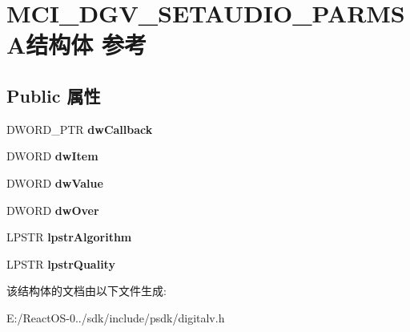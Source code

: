 \hypertarget{struct_m_c_i___d_g_v___s_e_t_a_u_d_i_o___p_a_r_m_s_a}{}\section{M\+C\+I\+\_\+\+D\+G\+V\+\_\+\+S\+E\+T\+A\+U\+D\+I\+O\+\_\+\+P\+A\+R\+M\+S\+A结构体 参考}
\label{struct_m_c_i___d_g_v___s_e_t_a_u_d_i_o___p_a_r_m_s_a}
\subsection*{Public 属性}
\begin{DoxyCompactItemize}
\item 
\mbox{\label{struct_m_c_i___d_g_v___s_e_t_a_u_d_i_o___p_a_r_m_s_a_ae3b97b8e94c676bb8e2e555ccc8f440f}} 
D\+W\+O\+R\+D\+\_\+\+P\+TR {\bfseries dw\+Callback}
\item 
\mbox{\label{struct_m_c_i___d_g_v___s_e_t_a_u_d_i_o___p_a_r_m_s_a_a71dc7ccebb1aee7948189930ead66404}} 
D\+W\+O\+RD {\bfseries dw\+Item}
\item 
\mbox{\label{struct_m_c_i___d_g_v___s_e_t_a_u_d_i_o___p_a_r_m_s_a_a4cf0da609994ae6bc2f5ab71af22732f}} 
D\+W\+O\+RD {\bfseries dw\+Value}
\item 
\mbox{\label{struct_m_c_i___d_g_v___s_e_t_a_u_d_i_o___p_a_r_m_s_a_aaa91a9e61b44b130e3cf245405308dcb}} 
D\+W\+O\+RD {\bfseries dw\+Over}
\item 
\mbox{\label{struct_m_c_i___d_g_v___s_e_t_a_u_d_i_o___p_a_r_m_s_a_a59c4c07f2d9e7a5c7153371bb3348d3f}} 
L\+P\+S\+TR {\bfseries lpstr\+Algorithm}
\item 
\mbox{\label{struct_m_c_i___d_g_v___s_e_t_a_u_d_i_o___p_a_r_m_s_a_a6738bcbcb653e29ec38e52a447353117}} 
L\+P\+S\+TR {\bfseries lpstr\+Quality}
\end{DoxyCompactItemize}


该结构体的文档由以下文件生成\+:\begin{DoxyCompactItemize}
\item 
E\+:/\+React\+O\+S-\/0../sdk/include/psdk/digitalv.\+h\end{DoxyCompactItemize}
